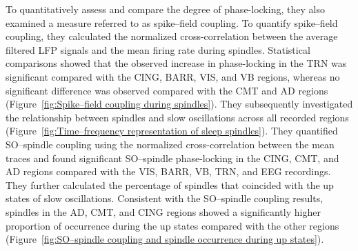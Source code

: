 \documentclass[12pt]{report}
\begin{document}
	To quantitatively assess and compare the degree of phase-locking, they also examined a measure referred to as spike–field coupling. To quantify spike–field coupling, they calculated the normalized cross-correlation between the average filtered LFP signals and the mean firing rate during spindles. Statistical comparisons showed that the observed increase in phase-locking in the TRN was significant compared with the CING, BARR, VIS, and VB regions, whereas no significant difference was observed compared with the CMT and AD regions (Figure~\ref{fig:Spike–field coupling during spindles}).
	They subsequently investigated the relationship between spindles and slow oscillations across all recorded regions (Figure~\ref{fig:Time–frequency representation of sleep spindles}). They quantified SO–spindle coupling using the normalized cross-correlation between the mean traces and found significant SO–spindle phase-locking in the CING, CMT, and AD regions compared with the VIS, BARR, VB, TRN, and EEG recordings.
	They further calculated the percentage of spindles that coincided with the up states of slow oscillations. Consistent with the SO–spindle coupling results, spindles in the AD, CMT, and CING regions showed a significantly higher proportion of occurrence during the up states compared with the other regions (Figure~\ref{fig:SO–spindle coupling and spindle occurrence during up states}).
	
\end{document}
